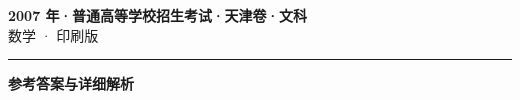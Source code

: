 \documentclass[zihao=5, a4paper]{ctexart}
\begin{document}
\begin{center}
  {\Large\bfseries 2007 年·普通高等学校招生考试·天津卷·文科}\\[4pt]
  {\large 数学 · 印刷版}
\end{center}
\medskip
{}

\par\bigskip\hrule\bigskip
{}
\begin{center}{\large\bfseries 参考答案与详细解析}\end{center}
\smallskip

\end{document}
